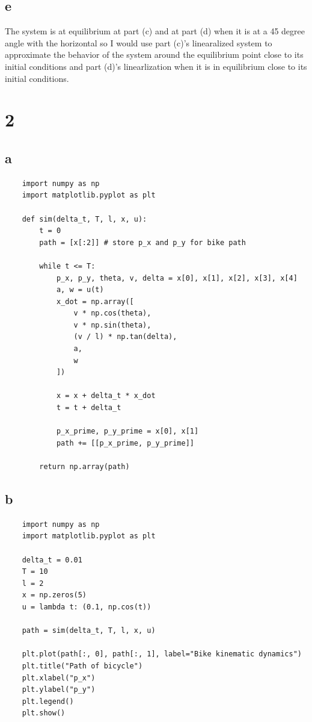 \documentclass[11pt]{article}
\begin{document}
\subsection{e}

The system is at equilibrium at part (c) and at part (d) when it is at a 45 degree angle with the horizontal so I would use part (c)'s linearalized system to approximate the behavior of the system around the equilibrium point close to its initial conditions and part (d)'s linearlization when it is in equilibrium close to its initial conditions.

\section{2}

\subsection{a}

\begin{verbatim}
    import numpy as np
    import matplotlib.pyplot as plt

    def sim(delta_t, T, l, x, u):
        t = 0
        path = [x[:2]] # store p_x and p_y for bike path

        while t <= T:
            p_x, p_y, theta, v, delta = x[0], x[1], x[2], x[3], x[4]
            a, w = u(t)
            x_dot = np.array([
                v * np.cos(theta),
                v * np.sin(theta),
                (v / l) * np.tan(delta),
                a,
                w
            ])

            x = x + delta_t * x_dot
            t = t + delta_t

            p_x_prime, p_y_prime = x[0], x[1]
            path += [[p_x_prime, p_y_prime]]
        
        return np.array(path)
\end{verbatim}

\subsection{b}

\begin{verbatim}
    import numpy as np
    import matplotlib.pyplot as plt

    delta_t = 0.01
    T = 10
    l = 2
    x = np.zeros(5)
    u = lambda t: (0.1, np.cos(t))

    path = sim(delta_t, T, l, x, u)
    
    plt.plot(path[:, 0], path[:, 1], label="Bike kinematic dynamics")
    plt.title("Path of bicycle")
    plt.xlabel("p_x")
    plt.ylabel("p_y")
    plt.legend()
    plt.show()
\end{verbatim}
\end{document}
